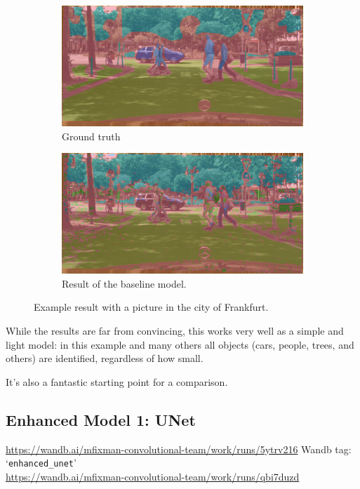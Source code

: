 \begin{figure}[h]
	\begin{subfigure}{.5\textwidth}
		\includegraphics[width=\textwidth]{city_images/baseline_gt_pic.png}
		\caption{Ground truth}
	\end{subfigure}
	\begin{subfigure}{.5\textwidth}
		\includegraphics[width=\textwidth]{city_images/baseline_pic.png}
		\caption{Result of the baseline model.}
	\end{subfigure}
	\caption{Example result with a picture in the city of Frankfurt.}
\end{figure}

While the results are far from convincing, this works very well as a simple and light model: in this example and many others all objects (cars, people, trees, and others) are identified, regardless of how small.

It's also a fantastic starting point for a comparison.

\newpage{}

\subsection{Enhanced Model 1: UNet}
\begin{scriptsize}
	\vspace{-\parskip}
	\url{https://wandb.ai/mfixman-convolutional-team/work/runs/5ytrv216}
	\hfill{} Wandb tag: `\texttt{enhanced\_unet}' \\[-4pt]
	\url{https://wandb.ai/mfixman-convolutional-team/work/runs/qbi7duzd}\footnotemark{}
\end{scriptsize}

